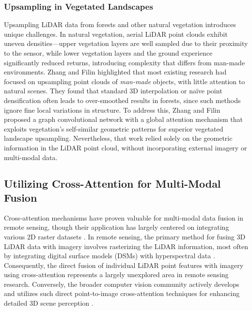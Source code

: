 \documentclass[remotesensing,article,submit,pdftex,moreauthors]{Definitions/mdpi}
\begin{document}
\subsubsection{Upsampling in Vegetated Landscapes}

Upsampling LiDAR data from forests and other natural vegetation introduces unique challenges. In natural vegetation, aerial LiDAR point clouds exhibit uneven densities—upper vegetation layers are well sampled due to their proximity to the sensor, while lower vegetation layers and the ground experience significantly reduced returns, introducing complexity that differs from man-made environments. Zhang and Filin \cite{zhang2022deep} highlighted that most existing research had focused on upsampling point clouds of \emph{man-made} objects, with little attention to natural scenes. They found that standard 3D interpolation or naïve point densification often leads to over-smoothed results in forests, since such methods ignore fine local variations in structure. To address this, Zhang and Filin proposed a graph convolutional network with a global attention mechanism that exploits vegetation's self-similar geometric patterns for superior vegetated landscape upsampling. Nevertheless, that work relied solely on the geometric information in the LiDAR point cloud, without incorporating external imagery or multi-modal data.

\subsection{Utilizing Cross-Attention for Multi-Modal Fusion}

Cross-attention mechanisms have proven valuable for multi-modal data fusion in remote sensing, though their application has largely centered on integrating various 2D raster datasets \cite{yan2025remote, ma2022crossmodal, qingyun2022cross, li2024cross}. In remote sensing, the primary method for fusing 3D LiDAR data with imagery involves rasterizing the LiDAR information, most often by integrating digital surface models (DSMs) with hyperspectral data \cite{yu2024dmsca, li2024multi, yang2024lidar}. Consequently, the direct fusion of individual LiDAR point features with imagery using cross-attention represents a largely unexplored area in remote sensing research. Conversely, the broader computer vision community actively develops and utilizes such direct point-to-image cross-attention techniques for enhancing detailed 3D scene perception \cite{zhu2024cams, yoo20203d, wu2021point}.
\end{document}
